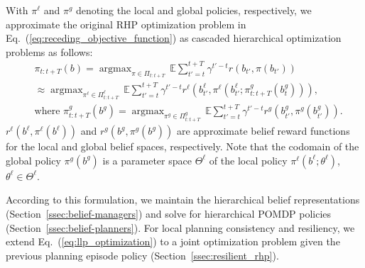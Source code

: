 \documentclass[letterpaper]{article} %
\newcommand{\phdone}[1]{} %
\newcommand{\argmax}{\mathop{\mathrm{argmax}}}
\begin{document}
With $\pi^\ell$ and $\pi^g$ denoting the local and global policies, respectively, we approximate the original RHP optimization problem in Eq.~(\ref{eq:receding_objective_function}) as cascaded hierarchical optimization problems as follows:
\small
\begin{align}
  &\pi_{t:t+T}(b)
  = \argmax_{\pi \in \Pi_{t:t+T}} \, \mathbb{E} \sum_{t'=t}^{t+T} \gamma^{t'-t} r(b_{t'}, \pi(b_{t'}))
  \nonumber \\
  & \approx \argmax_{\pi^\ell \in \Pi^\ell_{t:t+T}} \, \mathbb{E} \sum_{t'=t}^{t+T} \gamma^{t'-t} r^\ell(b^\ell_{t'}, \pi^\ell(b^\ell_{t'}; \pi_{t:t+T}^g(b^g_t))),
  \label{eq:llp_optimization}
  \\
  &\text{where }
  \pi_{t:t+T}^g(b^g) = \argmax_{\pi^g \in \Pi^g_{t:t+T}} \, \mathbb{E} \sum_{t'=t}^{t+T} \gamma^{t'-t} r^g(b^g_{t'}, \pi^g(b^g_{t'})).
  \label{eq:glp_optimization}
\end{align}
\normalsize
$r^\ell(b^\ell, \pi^\ell(b^\ell))$ and $r^g(b^g, \pi^g(b^g))$ are approximate belief reward functions for the local and global belief spaces, respectively.
%
Note that the codomain of the global policy $\pi^g(b^g)$ is a parameter space $\Theta^\ell$ of the local policy $\pi^\ell(b^\ell; \theta^\ell)$, $\theta^\ell \!\! \in \! \Theta^\ell\!$.\,

\phdone{Section Structure}
According to this formulation, we maintain the hierarchical belief representations (Section~\ref{ssec:belief-managers}) and solve for hierarchical POMDP policies (Section~\ref{ssec:belief-planners}).
For local planning consistency and resiliency, we extend Eq.~(\ref{eq:llp_optimization}) to a joint optimization problem given the previous planning episode policy (Section~\ref{ssec:resilient_rhp}).




\end{document}
